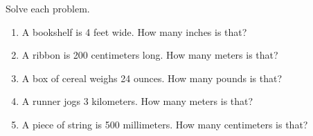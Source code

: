 \documentclass[12pt, letterpaper, fleqn]{article}
\begin{document}
\noindent
Solve each problem.

\vspace{3mm}

\begin{enumerate}[itemsep=1.8cm, leftmargin=0.6cm]

\item A bookshelf is 4 feet wide. How many inches is that?

\vspace{1.2cm}

\item A ribbon is 200 centimeters long. How many meters is that?

\vspace{1.2cm}

\item A box of cereal weighs 24 ounces. How many pounds is that?

\vspace{1.2cm}

\item A runner jogs 3 kilometers. How many meters is that?

\vspace{1.2cm}

\item A piece of string is 500 millimeters. How many centimeters is that?

\vspace{1.2cm}

\end{enumerate}
\end{document}

